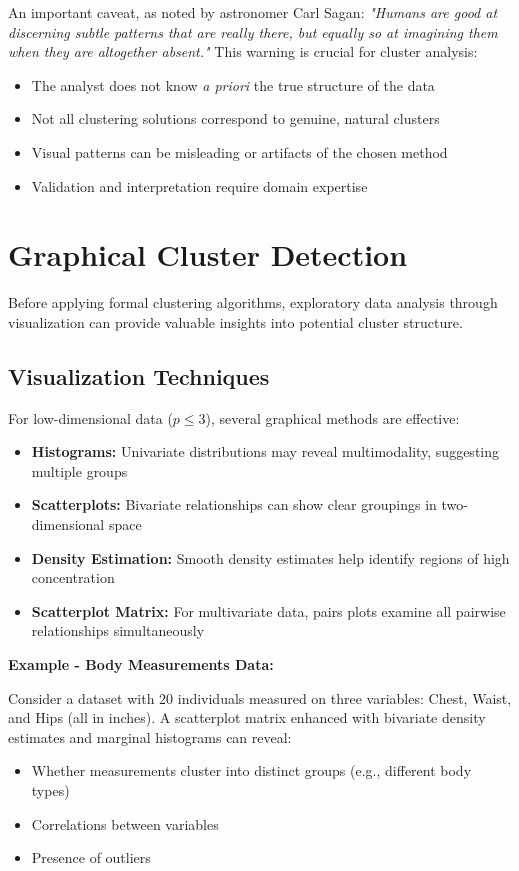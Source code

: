 \documentclass[11pt]{article}
\begin{document}
An important caveat, as noted by astronomer Carl Sagan: \textit{"Humans are good at discerning subtle patterns that are really there, but equally so at imagining them when they are altogether absent."} This warning is crucial for cluster analysis:

\begin{itemize}
    \item The analyst does not know \textit{a priori} the true structure of the data
    \item Not all clustering solutions correspond to genuine, natural clusters
    \item Visual patterns can be misleading or artifacts of the chosen method
    \item Validation and interpretation require domain expertise
\end{itemize}

\section{Graphical Cluster Detection}

Before applying formal clustering algorithms, exploratory data analysis through visualization can provide valuable insights into potential cluster structure.

\subsection{Visualization Techniques}

For low-dimensional data ($p \leq 3$), several graphical methods are effective:

\begin{itemize}
    \item \textbf{Histograms:} Univariate distributions may reveal multimodality, suggesting multiple groups
    \item \textbf{Scatterplots:} Bivariate relationships can show clear groupings in two-dimensional space
    \item \textbf{Density Estimation:} Smooth density estimates help identify regions of high concentration
    \item \textbf{Scatterplot Matrix:} For multivariate data, pairs plots examine all pairwise relationships simultaneously
\end{itemize}

\textbf{Example - Body Measurements Data:}

Consider a dataset with 20 individuals measured on three variables: Chest, Waist, and Hips (all in inches). A scatterplot matrix enhanced with bivariate density estimates and marginal histograms can reveal:
\begin{itemize}
    \item Whether measurements cluster into distinct groups (e.g., different body types)
    \item Correlations between variables
    \item Presence of outliers
\end{itemize}
\end{document}
